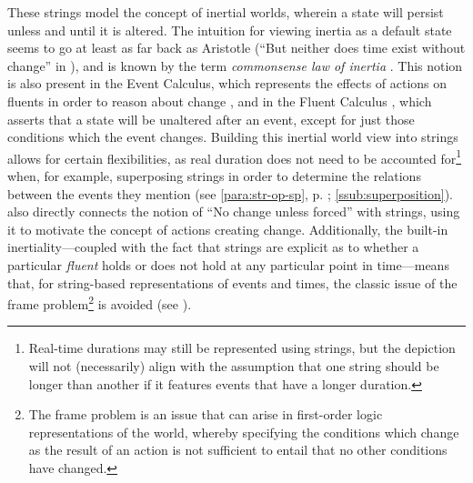 \documentclass[a4paper,12pt,leqno]{article}
\newcommand{\selfnote}[1]{{\color{red}[NB\footnote{{\color{red}#1}}]}}
\newcommand{\nb}{\selfnote}
\begin{document}
These strings model the concept of inertial worlds, wherein a state will persist unless and until it is altered. The intuition for viewing inertia as a default state seems to go at least as far back as Aristotle (``But neither does time exist without change'' in \textit{}), and is known by the term \textit{commonsense law of inertia} \citep[p. 19]{shanahan1997solving}. This notion is also present in the Event Calculus, which represents the effects of actions on fluents in order to reason about change \citep{Kowalski1986,Miller1999,Mueller2008}, and in the Fluent Calculus \citep{thielscher1999situation}, which asserts that a state will be unaltered after an event, except for just those conditions which the event changes.
Building this inertial world view into strings allows for certain flexibilities, as real duration does not need to be accounted for\footnote{Real-time durations may still be represented using strings, but the depiction will not (necessarily) align with the assumption that one string should be longer than another if it features events that have a longer duration.} when, for example, superposing strings in order to determine the relations between the events they mention (see \cref{para:str-op-sp}, p. \pageref{para:str-op-sp}; \cref{ssub:superposition}). \citet[p. 44]{Fernando2018} also directly connects the notion of ``No change unless forced'' with strings, using it to motivate the concept of actions creating change. Additionally, the built-in inertiality---coupled with the fact that strings are explicit as to whether a particular \textit{fluent} holds or does not hold at any particular point in time---means that, for string-based representations of events and times, the classic issue of the frame problem\footnote{The frame problem is an issue that can arise in first-order logic representations of the world, whereby specifying the conditions which change as the result of an action is not sufficient to entail that no other conditions have changed.} is avoided (see \citet[pp. 30-31]{Mccarthy69somephilosophical}).


\end{document}
